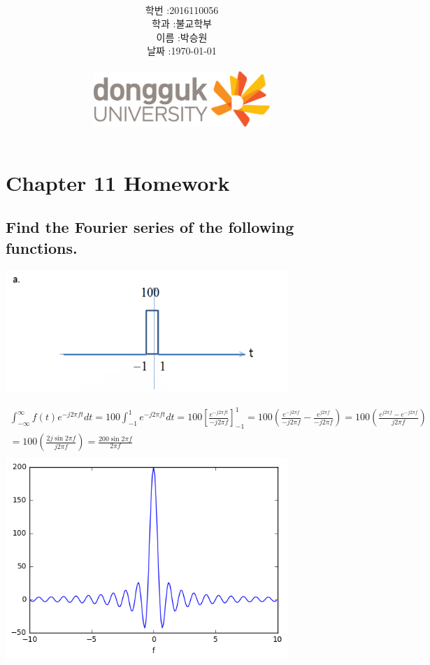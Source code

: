\documentclass[12pt,a4paper]{article}
\title{
	\centering
	\pgfornament[width=12cm,color=teal]{84}\\
	\vspace{1cm}
	\fontsize{50}{50} \selectfont {정보통신 수학 및 실습\\Homework}\\
		\pgfornament[width=12cm,color=teal]{88}\\
	\vfill}
\author{
	\LARGE
	\begin{tabular}{rl}
		\hline
		학번 : & 2016110056\\ 
		학과 : & 불교학부 \\
		이름 : & 박승원\\
		날짜 : & \today\\
		\hline
	\end{tabular}\vspace{2cm}
	\\
\includegraphics[width=0.5\textwidth]{logo.jpg}
	}
\date{}
\begin{document}
\maketitle
{}
\noindent
\lstset{language=matlab, columns=flexible, tabsize=4, frame=shadowbox, showstringspaces=false, breaklines=true, upquote=true, basicstyle=\normalsize}

\renewcommand{\thesubsubsection}{\alph{subsubsection})}
\renewcommand{\thesubsection}{\arabic{subsection}.}
\newpage

\section*{Chapter 11 Homework}
\subsection{Find the Fourier series of the following functions. } 
\includegraphics[width=0.8\textwidth]{a.png}

\begin{gather*}
\int_{-\infty}^{\infty} f(t)e^{-j2\pi ft}dt
=100\int_{-1}^{1}e^{-j2\pi ft}dt
=100\left[\frac{e^{-j2\pi ft}}{-j2\pi f}\right]_{-1}^1
=100(\frac{e^{-j2\pi f}}{-j2\pi f}-\frac{e^{j2\pi f}}{-j2\pi f})
=100(\frac{e^{j2\pi f}-e^{-j2\pi f}}{j2\pi f})\\
=100(\frac{2j\sin 2\pi f}{j2\pi f})
=\frac{200\sin 2\pi f}{2\pi f}\\
\end{gather*}
\includegraphics[width=0.8\textwidth]{3.png}
\end{document}

